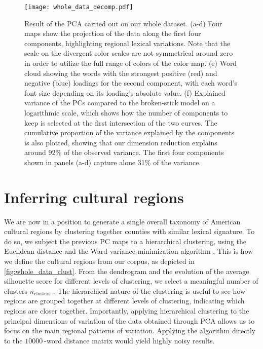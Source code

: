 \documentclass[../thesis.tex]{subfiles}
\begin{document}
\begin{figure}[ht!]
\centering
  \texttt{[image: whole\_data\_decomp.pdf]}
  \caption{Result of the \ac{PCA} carried out on our whole dataset. (a-d) Four maps show
  the projection of the data along the first four components, highlighting regional
  lexical variations. Note that the scale on the divergent color scales are not
  symmetrical around zero in order to utilize the full range of colors of the color map.
  (e) Word cloud showing the words with the strongest positive (red) and negative (blue)
  loadings for the second component, with each word's font size depending on its
  loading's absolute value. (f) Explained variance of the \acp{PC} compared to the
  broken-stick model on a logarithmic scale, which shows how the number of components to
  keep is selected at the first intersection of the two curves. The cumulative
  proportion of the variance explained by the components is also plotted, showing that
  our dimension reduction explains around 92\% of the observed variance. The first four
  components shown in panels (a-d) capture alone 31\% of the variance.}
  \label{fig:whole_data_decomp}
\end{figure}


\section{Inferring cultural regions}

We are now in a position to generate a single overall taxonomy of American cultural
regions by clustering together counties with similar lexical signature. To do so, we
subject the previous \ac{PC} maps to a hierarchical clustering, using the Euclidean
distance and the Ward variance minimization algorithm \cite{EverittClusterAnalysis2011}.
This is how we define the cultural regions from our corpus, as depicted in
\cref{fig:whole_data_clust}. From the dendrogram and the evolution of the average
silhouette score for different levels of clustering, we select a meaningful number of
clusters $n_{\text{clusters}}$ \cite{RousseeuwSilhouettesGraphical1987}. The
hierarchical nature of the clustering is useful to see how regions are grouped together
at different levels of clustering, indicating which regions are closer together.
Importantly, applying hierarchical clustering to the principal dimensions of variation
of the data obtained through \ac{PCA} allows us to focus on the main regional
patterns of variation. Applying the algorithm directly to the $\SI{10000}{}$-word
distance matrix would yield highly noisy results.
\end{document}
